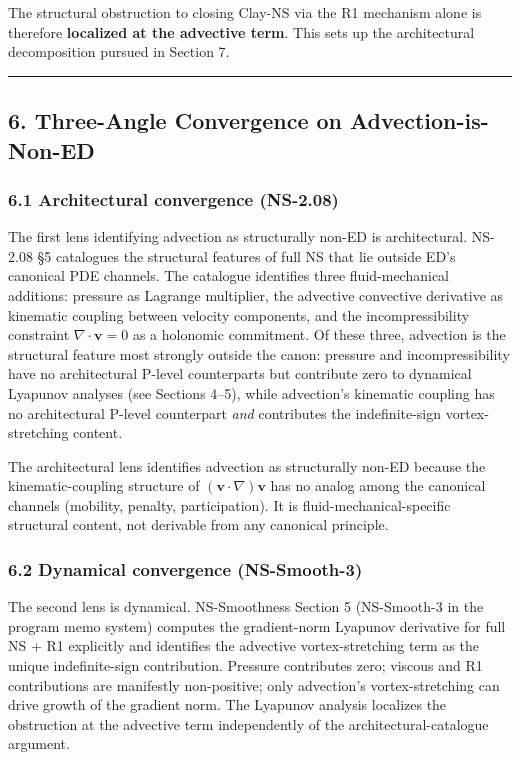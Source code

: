\documentclass[
  11pt,a4paper]{article}
\begin{document}
The structural obstruction to closing Clay-NS via the R1 mechanism alone
is therefore \textbf{localized at the advective term}. This sets up the
architectural decomposition pursued in Section 7.

\begin{center}\rule{0.5\linewidth}{0.5pt}\end{center}

\subsection{6. Three-Angle Convergence on
Advection-is-Non-ED}\label{three-angle-convergence-on-advection-is-non-ed}

\subsubsection{6.1 Architectural convergence
(NS-2.08)}\label{architectural-convergence-ns-2.08}

The first lens identifying advection as structurally non-ED is
architectural. NS-2.08 §5 catalogues the structural features of full NS
that lie outside ED's canonical PDE channels. The catalogue identifies
three fluid-mechanical additions: pressure as Lagrange multiplier, the
advective convective derivative as kinematic coupling between velocity
components, and the incompressibility constraint
\(\nabla \cdot \mathbf{v} = 0\) as a holonomic commitment. Of these
three, advection is the structural feature most strongly outside the
canon: pressure and incompressibility have no architectural P-level
counterparts but contribute zero to dynamical Lyapunov analyses (see
Sections 4--5), while advection's kinematic coupling has no
architectural P-level counterpart \emph{and} contributes the
indefinite-sign vortex-stretching content.

The architectural lens identifies advection as structurally non-ED
because the kinematic-coupling structure of
\((\mathbf{v} \cdot \nabla)\mathbf{v}\) has no analog among the
canonical channels (mobility, penalty, participation). It is
fluid-mechanical-specific structural content, not derivable from any
canonical principle.

\subsubsection{6.2 Dynamical convergence
(NS-Smooth-3)}\label{dynamical-convergence-ns-smooth-3}

The second lens is dynamical. NS-Smoothness Section 5 (NS-Smooth-3 in
the program memo system) computes the gradient-norm Lyapunov derivative
for full NS + R1 explicitly and identifies the advective
vortex-stretching term as the unique indefinite-sign contribution.
Pressure contributes zero; viscous and R1 contributions are manifestly
non-positive; only advection's vortex-stretching can drive growth of the
gradient norm. The Lyapunov analysis localizes the obstruction at the
advective term independently of the architectural-catalogue argument.
\end{document}
